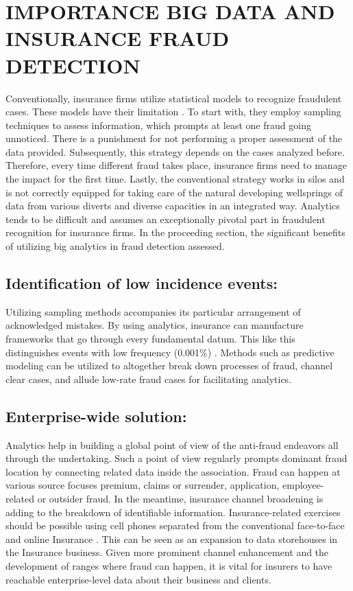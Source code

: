 \documentclass[sigconf]{acmart}
\begin{document}
\section{IMPORTANCE BIG DATA AND INSURANCE FRAUD DETECTION}
Conventionally, insurance firms utilize statistical models to recognize fraudulent cases. These models have their limitation \cite{4}. To start with, they employ sampling techniques to assess information, which prompts at least one fraud going unnoticed. There is a punishment for not performing a proper assessment of the data provided. Subsequently, this strategy depends on the cases analyzed before. Therefore, every time different fraud takes place, insurance firms need to manage the impact for the first time. Lastly, the conventional strategy works in silos and is not correctly equipped for taking care of the natural developing wellsprings of data from various diverts and diverse capacities in an integrated way. Analytics tends to be difficult and assumes an exceptionally pivotal part in fraudulent recognition for insurance firms. In the proceeding section, the significant benefits of utilizing big analytics in fraud detection assessed.

\subsection{Identification of low incidence events: }
Utilizing sampling methods accompanies its particular arrangement of acknowledged mistakes. By using analytics, insurance can manufacture frameworks that go through every fundamental datum. This like this distinguishes events with low frequency (0.001{\%}) \cite{3}. Methods such as predictive modeling can be utilized to altogether break down processes of fraud, channel clear cases, and allude low-rate fraud cases for facilitating analytics. 



\subsection{Enterprise-wide solution:}

Analytics help in building a global point of view of the anti-fraud endeavors all through the undertaking. Such a point of view regularly prompts dominant fraud location by connecting related data inside the association. Fraud can happen at various source focuses premium, claims or surrender, application, employee-related or outsider fraud. In the meantime, insurance channel broadening is adding to the breakdown of identifiable information. Insurance-related exercises should be possible using cell phones separated from the conventional face-to-face and online Insurance \cite{4,5}. This can be seen as an expansion to data storehouses in the Insurance business. Given more prominent channel enhancement and the development of ranges where fraud can happen, it is vital for insurers to have reachable enterprise-level data about their business and clients. 
\end{document}
